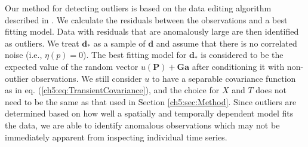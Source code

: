 Our method for detecting outliers is based on the data editing
algorithm described in \citet{Gibbs2011}. We calculate the residuals
between the observations and a best fitting model. Data with residuals
that are anomalously large are then identified as outliers. We treat
$\mathbf{d}_*$ as a sample of $\mathbf{d}$ and assume that there is no
correlated noise (i.e., $\eta(p) = 0$).  The best fitting model for
$\mathbf{d}_*$ is considered to be the expected value of the random
vector $u(\mathbf{P}) + \mathbf{G}\mathbf{a}$ after conditioning it
with non-outlier observations.  We still consider $u$ to have a
separable covariance function as in eq.
(\ref{ch5:eq:TransientCovariance}), and the choice for $X$ and $T$
does not need to be the same as that used in Section
\ref{ch5:sec:Method}. Since outliers are determined based on how well
a spatially and temporally dependent model fits the data, we are able
to identify anomalous observations which may not be immediately
apparent from inspecting individual time series.

